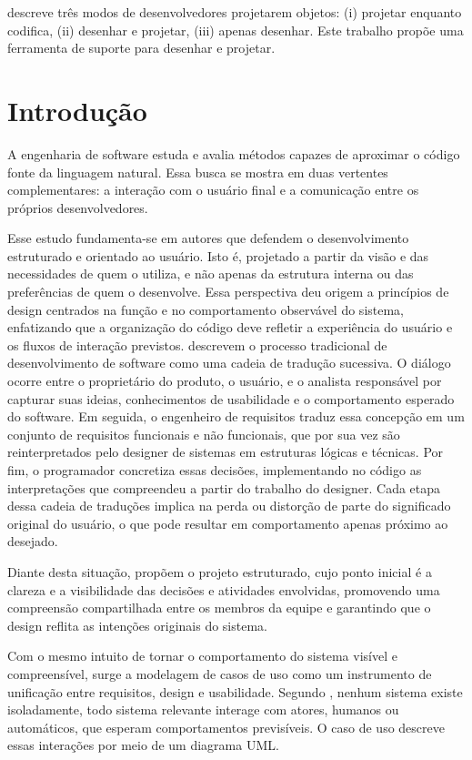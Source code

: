 \documentclass[12pt,a4paper]{article}
\begin{document}
\textcite{larman2002applying} descreve três modos de desenvolvedores projetarem objetos: (i) projetar enquanto codifica, (ii) desenhar e projetar, (iii) apenas desenhar. Este trabalho propõe uma ferramenta de suporte para desenhar e projetar. %

\section{Introdução}

A engenharia de software estuda e avalia métodos capazes de aproximar o código fonte da linguagem natural. Essa busca se mostra em duas vertentes complementares: a interação com o usuário final e a comunicação entre os próprios desenvolvedores. 

Esse estudo fundamenta-se em autores que defendem o desenvolvimento estruturado e orientado ao usuário. Isto é, projetado a partir da visão e das necessidades de quem o utiliza, e não apenas da estrutura interna ou das preferências de quem o desenvolve. Essa perspectiva deu origem a princípios de design centrados na função e no comportamento observável do sistema, enfatizando que a organização do código deve refletir a experiência do usuário e os fluxos de interação previstos. \textcite{yourdon1979structured} descrevem o processo tradicional de desenvolvimento de software como uma cadeia de tradução sucessiva. O diálogo ocorre entre o proprietário do produto, o usuário, e o analista responsável por capturar suas ideias, conhecimentos de usabilidade e o comportamento esperado do software. Em seguida, o engenheiro de requisitos traduz essa concepção em um conjunto de requisitos funcionais e não funcionais, que por sua vez são reinterpretados pelo designer de sistemas em estruturas lógicas e técnicas. Por fim, o programador concretiza essas decisões, implementando no código as interpretações que compreendeu a partir do trabalho do designer. Cada etapa dessa cadeia de traduções implica na perda ou distorção de parte do significado original do usuário, o que pode resultar em comportamento apenas próximo ao desejado.

Diante desta situação, \textcite{yourdon1979structured} propõem o projeto estruturado, cujo ponto inicial é a clareza e a visibilidade das decisões e atividades envolvidas, promovendo uma compreensão compartilhada entre os membros da equipe e garantindo que o design reflita as intenções originais do sistema.

Com o mesmo intuito de tornar o comportamento do sistema visível e compreensível, surge a modelagem de casos de uso como um instrumento de unificação entre requisitos, design e usabilidade. Segundo \textcite{booch1999unified}, nenhum sistema existe isoladamente, todo sistema relevante interage com atores, humanos ou automáticos, que esperam comportamentos previsíveis. O caso de uso descreve essas interações por meio de um diagrama UML.
\end{document}
